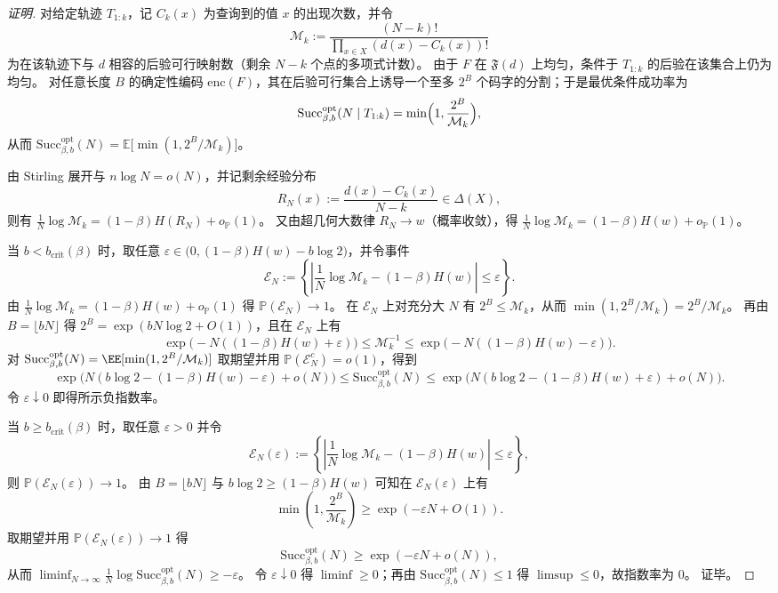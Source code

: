 \begin{proof}[证明]
对给定轨迹 \(T_{1:k}\)，记 \(C_k(x)\) 为查询到的值 \(x\) 的出现次数，并令
\[
\mathcal{M}_k
:=
\frac{(N-k)!}{\prod_{x\in X}(d(x)-C_k(x))!}
\]
为在该轨迹下与 \(d\) 相容的后验可行映射数（剩余 \(N-k\) 个点的多项式计数）。
由于 \(F\) 在 \(\mathfrak{F}(d)\) 上均匀，条件于 \(T_{1:k}\) 的后验在该集合上仍为均匀。
对任意长度 \(B\) 的确定性编码 \(\mathrm{enc}(F)\)，其在后验可行集合上诱导一个至多 \(2^B\) 个码字的分割；于是最优条件成功率为
\[
\mathrm{Succ}^{\mathrm{opt}}_{\beta,b}(N\mid T_{1:k})
=\min\Bigl(1,\frac{2^B}{\mathcal{M}_k}\Bigr),
\]
从而
\(
\mathrm{Succ}^{\mathrm{opt}}_{\beta,b}(N)=\mathbb{E}\bigl[\min(1,2^B/\mathcal{M}_k)\bigr]
\)。
\par
由 Stirling 展开与 \(n\log N=o(N)\)，并记剩余经验分布
\[
R_N(x):=\frac{d(x)-C_k(x)}{N-k}\in\Delta(X),
\]
则有
\(
\frac{1}{N}\log\mathcal{M}_k=(1-\beta)H(R_N)+o_{\mathbb{P}}(1)
\)。
又由超几何大数律 \(R_N\to w\)（概率收敛），得
\(
\frac{1}{N}\log\mathcal{M}_k=(1-\beta)H(w)+o_{\mathbb{P}}(1)
\)。
\par
当 \(b<b_{\mathrm{crit}}(\beta)\) 时，取任意 \(\varepsilon\in\bigl(0,(1-\beta)H(w)-b\log 2\bigr)\)，并令事件
\[
\mathcal{E}_N:=\left\{\left|\frac{1}{N}\log\mathcal{M}_k-(1-\beta)H(w)\right|\le \varepsilon\right\}.
\]
由 \(\frac{1}{N}\log\mathcal{M}_k=(1-\beta)H(w)+o_{\mathbb{P}}(1)\) 得 \(\mathbb{P}(\mathcal{E}_N)\to 1\)。
在 \(\mathcal{E}_N\) 上对充分大 \(N\) 有 \(2^B\le \mathcal{M}_k\)，从而 \(\min(1,2^B/\mathcal{M}_k)=2^B/\mathcal{M}_k\)。
再由 \(B=\lfloor bN\rfloor\) 得 \(2^B=\exp(bN\log 2+O(1))\)，且在 \(\mathcal{E}_N\) 上有
\[
\exp\!\bigl(-N((1-\beta)H(w)+\varepsilon)\bigr)
\le
\mathcal{M}_k^{-1}
\le
\exp\!\bigl(-N((1-\beta)H(w)-\varepsilon)\bigr).
\]
对 \(\mathrm{Succ}^{\mathrm{opt}}_{\beta,b}(N)=\EE[\min(1,2^B/\mathcal{M}_k)]\) 取期望并用 \(\mathbb{P}(\mathcal{E}_N^c)=o(1)\)，得到
\[
\exp\!\bigl(N(b\log 2-(1-\beta)H(w)-\varepsilon)+o(N)\bigr)
\le
\mathrm{Succ}^{\mathrm{opt}}_{\beta,b}(N)
\le
\exp\!\bigl(N(b\log 2-(1-\beta)H(w)+\varepsilon)+o(N)\bigr).
\]
令 \(\varepsilon\downarrow 0\) 即得所示负指数率。
\par
当 \(b\ge b_{\mathrm{crit}}(\beta)\) 时，取任意 \(\varepsilon>0\) 并令
\[
\mathcal{E}_N(\varepsilon):=\left\{\left|\frac{1}{N}\log\mathcal{M}_k-(1-\beta)H(w)\right|\le \varepsilon\right\},
\]
则 \(\mathbb{P}(\mathcal{E}_N(\varepsilon))\to 1\)。
由 \(B=\lfloor bN\rfloor\) 与 \(b\log 2\ge (1-\beta)H(w)\) 可知在 \(\mathcal{E}_N(\varepsilon)\) 上有
\[
\min\!\left(1,\frac{2^B}{\mathcal{M}_k}\right)
\ge
\exp(-\varepsilon N+O(1)).
\]
取期望并用 \(\mathbb{P}(\mathcal{E}_N(\varepsilon))\to 1\) 得
\[
\mathrm{Succ}^{\mathrm{opt}}_{\beta,b}(N)\ge \exp(-\varepsilon N+o(N)),
\]
从而 \(\liminf_{N\to\infty}\frac{1}{N}\log \mathrm{Succ}^{\mathrm{opt}}_{\beta,b}(N)\ge -\varepsilon\)。
令 \(\varepsilon\downarrow 0\) 得 \(\liminf\ge 0\)；再由 \(\mathrm{Succ}^{\mathrm{opt}}_{\beta,b}(N)\le 1\) 得 \(\limsup\le 0\)，故指数率为 \(0\)。
证毕。
\end{proof}

